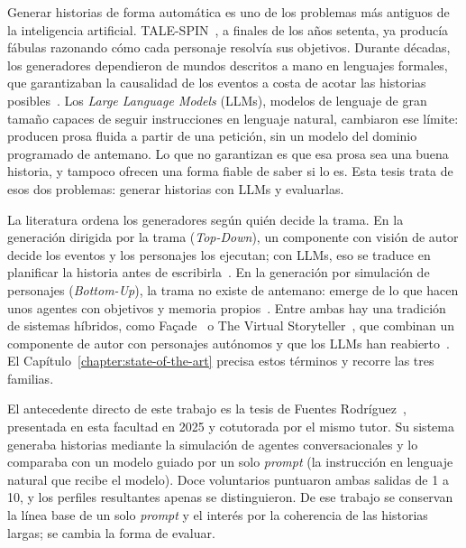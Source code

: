 \begin{introduction}\label{chapter:introduction}

Generar historias de forma automática es uno de los problemas más antiguos de la inteligencia
artificial. TALE-SPIN~\cite{meehan1977}, a finales de los años setenta, ya producía fábulas
razonando cómo cada personaje resolvía sus objetivos. Durante décadas, los generadores dependieron
de mundos descritos a mano en lenguajes formales, que garantizaban la causalidad de los eventos a
costa de acotar las historias posibles~\cite{riedl2010}. Los \textit{Large Language Models}
(LLMs), modelos de lenguaje de gran tamaño capaces de seguir instrucciones en lenguaje natural,
cambiaron ese límite: producen prosa fluida a partir de una petición, sin un modelo del dominio
programado de antemano. Lo que no garantizan es que esa prosa sea una buena historia, y tampoco
ofrecen una forma fiable de saber si lo es. Esta tesis trata de esos dos problemas: generar
historias con LLMs y evaluarlas.

La literatura ordena los generadores según quién decide la trama. En la generación dirigida por la
trama (\textit{Top-Down}), un componente con visión de autor decide los eventos y los personajes
los ejecutan; con LLMs, eso se traduce en planificar la historia antes de
escribirla~\cite{yang2023,huot2025}. En la generación por simulación de personajes
(\textit{Bottom-Up}), la trama no existe de antemano: emerge de lo que hacen unos agentes con
objetivos y memoria propios~\cite{aylett1999,park2023}. Entre ambas hay una tradición de sistemas
híbridos, como Façade~\cite{mateas2005} o The Virtual Storyteller~\cite{theune2003}, que combinan
un componente de autor con personajes autónomos y que los LLMs han reabierto~\cite{chen2026a}. El
Capítulo~\ref{chapter:state-of-the-art} precisa estos términos y recorre las tres familias.

El antecedente directo de este trabajo es la tesis de Fuentes Rodríguez~\cite{fuentes2025},
presentada en esta facultad en 2025 y cotutorada por el mismo tutor. Su sistema generaba
historias mediante la simulación de agentes conversacionales y lo comparaba con un modelo guiado
por un solo \textit{prompt} (la instrucción en lenguaje natural que recibe el modelo). Doce
voluntarios puntuaron ambas salidas de 1 a 10, y los perfiles resultantes apenas se distinguieron.
De ese trabajo se conservan la línea base de un solo \textit{prompt} y el interés por la coherencia
de las historias largas; se cambia la forma de evaluar.


\end{introduction}
